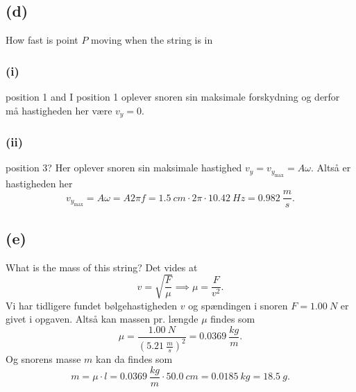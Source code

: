 \documentclass[12pt]{article}
\theoremstyle{definition}
\begin{document}
\subsection*{(d)}
How fast is point $P$ moving when the string is in 

\subsubsection*{(i)}
position 1 and
\bigbreak
I position 1 oplever snoren sin maksimale forskydning og derfor må hastigheden her være $v_y = 0$.

\subsubsection*{(ii)}
position 3?
\bigbreak
Her oplever snoren sin maksimale hastighed $v_y = v_{y_{\text{max}}} = A \omega$. Altså er hastigheden her
\[ 
v_{y_{\text{max}}} = A\omega = A 2\pi f = \qty{1,5}{cm} \cdot 2\pi \cdot \qty{10,42}{Hz} = \qty{0,982}{\frac{m}{s}} 
.\]


\subsection*{(e)}
What is the mass of this string?
\bigbreak
Det vides at
\[ 
v = \sqrt{\frac{F}{\mu}} \implies \mu = \frac{F}{v^2}
.\]
Vi har tidligere fundet bølgehastigheden $v$ og spændingen i snoren $F = \qty{1,00}{N}$ er givet i opgaven. Altså kan massen pr. længde $\mu$ findes som
\[ 
\mu = \frac{\qty{1,00}{N}}{\left( \qty{5,21}{\frac{m}{s}}  \right)^2} = \qty{0,0369}{\frac{kg}{m}} 
.\]
Og snorens masse $m$ kan da findes som
\[ 
m = \mu \cdot l = \qty{0,0369}{\frac{kg}{m}} \cdot \qty{50,0}{cm} = \qty{0,0185}{kg} = \qty{18,5}{g}  
.\]
\end{document}
